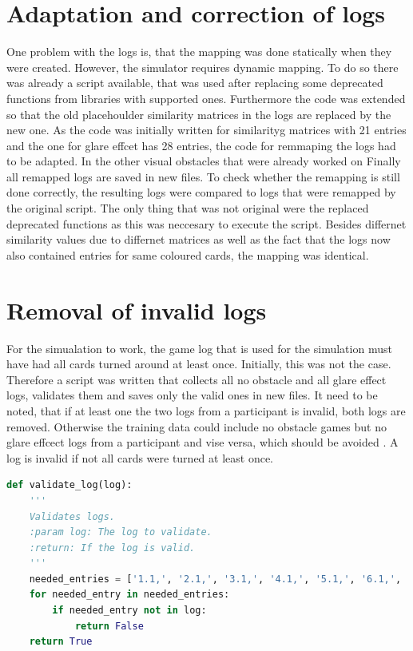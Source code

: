 \section{Adaptation and correction of logs}
One problem with the logs is, that the mapping was done statically when they were created. However, the simulator requires dynamic mapping.  To do so there was already a script available, that was used after replacing some deprecated functions from libraries with supported ones. Furthermore the code was extended so that the old placehoulder similarity matrices in the logs are replaced by the new one. As the code was initially written for similarityg matrices with 21 entries and the one for glare effcet has 28 entries, the code for remmaping the logs had to be adapted. In the other visual obstacles that were already worked on Finally all remapped logs are saved in new files. To check whether the remapping is still done correctly, the resulting logs were compared to logs that were remapped by the original script. The only thing that was not original were the replaced deprecated functions as this was neccesary to execute the script. Besides differnet similarity values due to differnet matrices as well as the fact that the logs now also contained entries for same coloured cards, the mapping was identical. 

\section{Removal of invalid logs}
For the simualation to work, the game log that is used for the simulation must have had all cards turned around at least once. Initially, this was not the case. Therefore a script was written that collects all no obstacle and all glare effect logs, validates them and saves only the valid ones in new files. It need to be noted, that if at least one the two logs from a participant is invalid, both logs are removed. Otherwise the training data could include no obstacle games but no glare effcect logs from a participant and vise versa, which should be avoided . A log is invalid if not all cards were turned at least once. 
\begin{lstlisting}[language=python, caption=Add caption]
def validate_log(log):
	'''
	Validates logs.
	:param log: The log to validate. 
	:return: If the log is valid.
	'''
	needed_entries = ['1.1,', '2.1,', '3.1,', '4.1,', '5.1,', '6.1,', '7.1,', '1.2,', '2.2,', '3.2,', '4.2,', '5.2,', '6.2,', '7.2,']
	for needed_entry in needed_entries:
		if needed_entry not in log:
			return False
	return True
\end{lstlisting}

